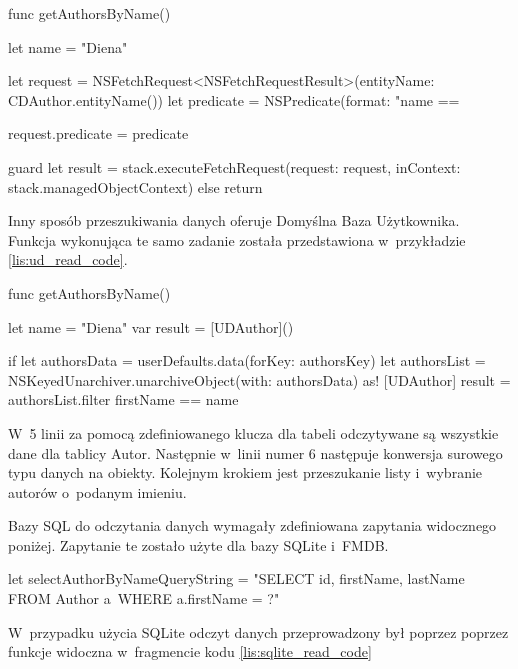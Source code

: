 \begin{code}[
		language=swift,
		caption={Przykład odczytu danych Core Data},
		label={lis:core_data_read_code},
	]
    func getAuthorsByName() {
        let name = "Diena"
        
        let request = NSFetchRequest<NSFetchRequestResult>(entityName: CDAuthor.entityName())
        let predicate = NSPredicate(format: "name == %
        
        request.predicate = predicate
        
        guard let result = stack.executeFetchRequest(request: request, inContext: stack.managedObjectContext) else { return }
    }
\end{code}

Inny sposób przeszukiwania danych oferuje Domyślna Baza Użytkownika. Funkcja wykonująca te samo zadanie została przedstawiona w~przykładzie \ref{lis:ud_read_code}.

\begin{code}[
		language=swift,
		caption={Przykład odczytu danych User Defaults},
		label={lis:ud_read_code},
	]
    func getAuthorsByName() {
        let name = "Diena"
        var result = [UDAuthor]()
        
        if  let authorsData = userDefaults.data(forKey: authorsKey) {
            let authorsList = NSKeyedUnarchiver.unarchiveObject(with: authorsData) as! [UDAuthor]
            result = authorsList.filter { firstName == name }
        }
    }
\end{code}


 W~5 linii za pomocą zdefiniowanego klucza dla tabeli odczytywane są wszystkie dane dla tablicy Autor. Następnie w~linii numer 6 następuje konwersja surowego typu danych na obiekty. Kolejnym krokiem jest przeszukanie listy i~wybranie autorów o~podanym imieniu. 

Bazy SQL do odczytania danych wymagały zdefiniowana zapytania widocznego poniżej. Zapytanie te zostało użyte dla bazy SQLite i~FMDB.

\begin{code}[
		language=swift,
		caption={Zapytanie SQL do odczytu danych},
		label={lis:sql_read_query_code},
	]
let selectAuthorByNameQueryString = "SELECT id, firstName, lastName FROM Author a~WHERE a.firstName = ?"
\end{code}

 W~przypadku użycia SQLite odczyt danych przeprowadzony był poprzez poprzez funkcje widoczna w~fragmencie kodu \ref{lis:sqlite_read_code}

